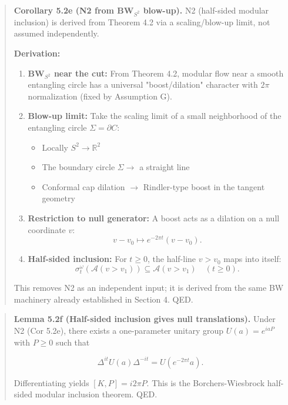 \begin{quote}
\textbf{Corollary 5.2e (N2 from BW\(_{S^2}\) blow-up).} N2 (half-sided modular inclusion) is derived from Theorem 4.2 via a scaling/blow-up limit, not assumed independently.

\textbf{Derivation:}

\begin{enumerate}
\def\labelenumi{\arabic{enumi}.}
\item
  \textbf{BW\(_{S^2}\) near the cut:} From Theorem 4.2, modular flow near a smooth entangling circle has a universal "boost/dilation" character with \(2\pi\) normalization (fixed by Assumption G).
\item
  \textbf{Blow-up limit:} Take the scaling limit of a small neighborhood of the entangling circle \(\Sigma = \partial C\):

  \begin{itemize}
  \tightlist
  \item
    Locally \(S^2 \to \mathbb{R}^2\)
  \item
    The boundary circle \(\Sigma \to\) a straight line
  \item
    Conformal cap dilation \(\to\) Rindler-type boost in the tangent geometry
  \end{itemize}
\item
  \textbf{Restriction to null generator:} A boost acts as a dilation on a null coordinate \(v\): \[
  v - v_0 \mapsto e^{-2\pi t}(v - v_0).
  \]
\item
  \textbf{Half-sided inclusion:} For \(t \ge 0\), the half-line \(v > v_0\) maps into itself: \[
  \sigma_t^{\omega}(\mathcal{A}(v > v_1)) \subseteq \mathcal{A}(v > v_1)
  \quad (t \ge 0).
  \]
\end{enumerate}

This removes N2 as an independent input; it is derived from the same BW machinery already established in Section 4. QED.
\end{quote}

\begin{quote}
\textbf{Lemma 5.2f (Half-sided inclusion gives null translations).} Under N2 (Cor 5.2e), there exists a one-parameter unitary group \(U(a)=e^{i a P}\) with \(P \ge 0\) such that

\[
\Delta^{it} U(a) \Delta^{-it} = U(e^{-2\pi t} a).
\]

Differentiating yields \([K,P] = i 2\pi P\). This is the Borchers-Wiesbrock half-sided modular inclusion theorem. QED.
\end{quote}

